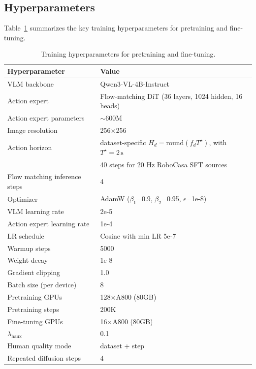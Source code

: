 \subsection{Hyperparameters}
\label{app:hyperparameters}

Table~\ref{tab:hyperparams} summarizes the key training hyperparameters for \Ours pretraining and fine-tuning.

\begin{table}[htbp]
\centering
\small
\caption{Training hyperparameters for \Ours pretraining and fine-tuning.}
\label{tab:hyperparams}
\begin{tabular}{ll}
\toprule
\textbf{Hyperparameter} & \textbf{Value} \\
\midrule
VLM backbone & Qwen3-VL-4B-Instruct \\
Action expert & Flow-matching DiT (36 layers, 1024 hidden, 16 heads) \\
Action expert parameters & $\sim$600M \\
Image resolution & 256$\times$256 \\
Action horizon & dataset-specific \(H_d = \mathrm{round}(f_d T^\star)\), with \(T^\star = 2\,\mathrm{s}\) \\ & 40 steps for 20 Hz RoboCasa SFT sources \\
Flow matching inference steps & 4 \\
Optimizer & AdamW ($\beta_1$=0.9, $\beta_2$=0.95, $\epsilon$=1e-8) \\
VLM learning rate & 2e-5 \\
Action expert learning rate & 1e-4 \\
LR schedule & Cosine with min LR 5e-7 \\
Warmup steps & 5000 \\
Weight decay & 1e-8 \\
Gradient clipping & 1.0 \\
Batch size (per device) & 8 \\
Pretraining GPUs & 128$\times$A800 (80GB) \\
Pretraining steps & 200K \\
Fine-tuning GPUs & 16$\times$A800 (80GB) \\
$\lambda_{\mathrm{haux}}$ & 0.1 \\
Human quality mode & dataset + step \\
Repeated diffusion steps & 4 \\
\bottomrule
\end{tabular}
\end{table}

